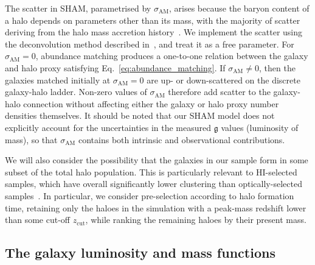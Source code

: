 \documentclass[usenatbib,useAMS]{mnras}
\newcommand{\scatter}{\ensuremath{\sigma_{\mathrm{AM}}}}
\begin{document}
The scatter in \ac{SHAM}, parametrised by $\scatter$, arises because the baryon content of a halo depends on parameters other than its mass, with the majority of scatter deriving from the halo mass accretion history~\citep{Tinker:2016zpi}. We implement the scatter using the deconvolution method described in~\citet{Behroozi2010}, and treat it as a free parameter. For $\scatter = 0$, abundance matching produces a one-to-one relation between the galaxy and halo proxy satisfying Eq.~\eqref{eq:abundance_matching}. If $\scatter \neq 0$, then the galaxies matched initially at $\scatter = 0$ are up- or down-scattered on the discrete galaxy-halo ladder. Non-zero values of $\scatter$ therefore add scatter to the galaxy-halo connection without affecting either the galaxy or halo proxy number densities themselves. It should be noted that our \ac{SHAM} model does not explicitly account for the uncertainties in the measured $\mathfrak{g}$ values (luminosity of mass), so that $\scatter$ contains both intrinsic and observational contributions.

We will also consider the possibility that the galaxies in our sample form in some subset of the total halo population. This is particularly relevant to HI-selected samples, which have overall significantly lower clustering than optically-selected samples~\citep{Guo, Papastergis_HIclust}. In particular, we consider pre-selection according to halo formation time, retaining only the haloes in the simulation with a peak-mass redshift lower than some cut-off $z_\mathrm{cut}$, while ranking the remaining haloes by their present mass.


\subsection{The galaxy luminosity and mass functions}\label{sec:LF}
\end{document}

